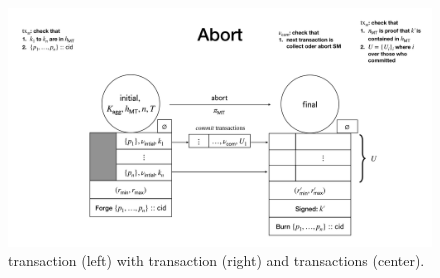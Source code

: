\begin{figure}

  \centering

  \includegraphics[width=\textwidth/2-2em,trim=350 20 240 300,
  clip]{figures/SM_initial_final.pdf}
    
  \caption{\mtxInit{} transaction (left) with \mtxAbort{} transaction
    (right) and \mtxCom{} transactions (center).}
  \label{fig:SM_initial_final}

\end{figure}



